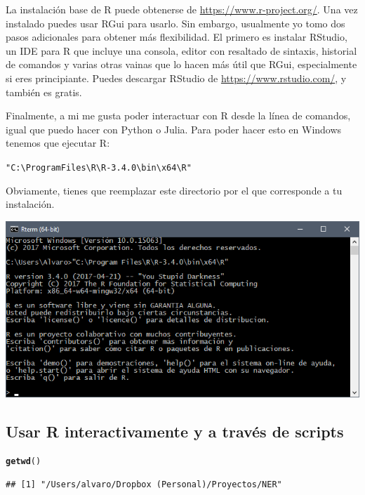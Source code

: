 \documentclass{report}\usepackage[]{graphicx}\usepackage[]{color}
\makeatletter
\newcommand{\hlstr}[1]{\textcolor[rgb]{0.192,0.494,0.8}{#1}}%
\newcommand{\hlstd}[1]{\textcolor[rgb]{0.345,0.345,0.345}{#1}}%
\newcommand{\hlkwd}[1]{\textcolor[rgb]{0.737,0.353,0.396}{\textbf{#1}}}%
\newenvironment{kframe}{%
 \def\at@end@of@kframe{}%
 \ifinner\ifhmode%
  \def\at@end@of@kframe{\end{minipage}}%
  \begin{minipage}{\columnwidth}%
 \fi\fi%
 \def\FrameCommand##1{\hskip\@totalleftmargin \hskip-\fboxsep
 \colorbox{shadecolor}{##1}\hskip-\fboxsep
     \hskip-\linewidth \hskip-\@totalleftmargin \hskip\columnwidth}%
 \MakeFramed {\advance\hsize-\width
   \@totalleftmargin\z@ \linewidth\hsize
   \@setminipage}}%
 {\par\unskip\endMakeFramed%
 \at@end@of@kframe}
\newenvironment{knitrout}{}{} %
\makeatother
\begin{document}
La instalación base de R puede obtenerse de \url{https://www.r-project.org/}. Una vez instalado puedes usar RGui para usarlo. Sin embargo, usualmente yo tomo dos pasos adicionales para obtener más flexibilidad. El primero es instalar RStudio, un IDE para R que incluye una consola, editor con resaltado de sintaxis, historial de comandos y varias otras vainas que lo hacen más útil que RGui, especialmente si eres principiante. Puedes descargar RStudio de \url{https://www.rstudio.com/}, y también es gratis.

Finalmente, a mi me gusta poder interactuar con R desde la línea de comandos, igual que puedo hacer con Python o Julia. Para poder hacer esto en Windows tenemos que ejecutar R:

\begin{knitrout}
\color{fgcolor}\begin{kframe}
\begin{alltt}
\hlstr{"C:\textbackslash{}Program Files\textbackslash{}R\textbackslash{}R-3.4.0\textbackslash{}bin\textbackslash{}x64\textbackslash{}R"}
\end{alltt}
\end{kframe}
\end{knitrout}

Obviamente, tienes que reemplazar este directorio por el que corresponde a tu instalación. 

\includegraphics[width=\linewidth]{sss/r-win-command-prompt}

\subsection{Usar R interactivamente y a través de scripts}

\begin{knitrout}
\color{fgcolor}\begin{kframe}
\begin{alltt}
\hlkwd{getwd}\hlstd{()}
\end{alltt}
\begin{verbatim}
## [1] "/Users/alvaro/Dropbox (Personal)/Proyectos/NER"
\end{verbatim}
\end{kframe}
\end{knitrout}
\end{document}
